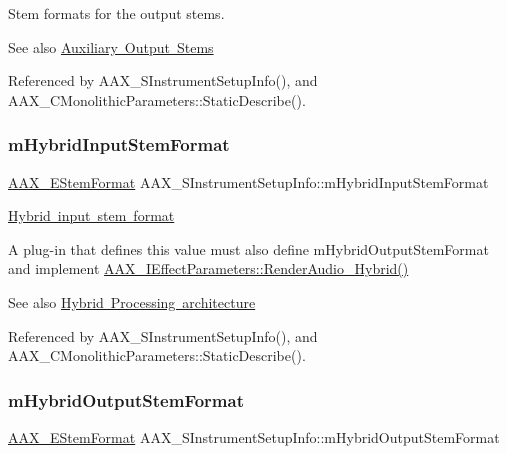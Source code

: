 Stem formats for the output stems. 

\begin{DoxySeeAlso}{See also}
\mbox{\hyperlink{a00809}{Auxiliary Output Stems}} 
\end{DoxySeeAlso}


Referenced by A\+A\+X\+\_\+\+S\+Instrument\+Setup\+Info(), and A\+A\+X\+\_\+\+C\+Monolithic\+Parameters\+::\+Static\+Describe().

\mbox{\label{a01957_aeeee9ec016294caab1317d170ee0a2c2}} 
\subsubsection{\texorpdfstring{mHybridInputStemFormat}{mHybridInputStemFormat}}
{\footnotesize\ttfamily \mbox{\hyperlink{a00491_ad8af5ef008b2bd478add9a0acb0a1d85}{A\+A\+X\+\_\+\+E\+Stem\+Format}} A\+A\+X\+\_\+\+S\+Instrument\+Setup\+Info\+::m\+Hybrid\+Input\+Stem\+Format}



\mbox{\hyperlink{a00805_ga13e384f22825afd3db6d68395b79ce0da33a950bc2e02d38fc3be0a0ad8cc89b1}{Hybrid input stem format}} 

A plug-\/in that defines this value must also define {\ttfamily m\+Hybrid\+Output\+Stem\+Format} and implement \mbox{\hyperlink{a00805_gae6139041de22f51f3146d26a01c54c1b}{A\+A\+X\+\_\+\+I\+Effect\+Parameters\+::\+Render\+Audio\+\_\+\+Hybrid()}} \begin{DoxySeeAlso}{See also}
\mbox{\hyperlink{a00805}{Hybrid Processing architecture}} 
\end{DoxySeeAlso}


Referenced by A\+A\+X\+\_\+\+S\+Instrument\+Setup\+Info(), and A\+A\+X\+\_\+\+C\+Monolithic\+Parameters\+::\+Static\+Describe().

\mbox{\label{a01957_a1cc911c56d96a35affcc8fea94a983ae}} 
\subsubsection{\texorpdfstring{mHybridOutputStemFormat}{mHybridOutputStemFormat}}
{\footnotesize\ttfamily \mbox{\hyperlink{a00491_ad8af5ef008b2bd478add9a0acb0a1d85}{A\+A\+X\+\_\+\+E\+Stem\+Format}} A\+A\+X\+\_\+\+S\+Instrument\+Setup\+Info\+::m\+Hybrid\+Output\+Stem\+Format}



